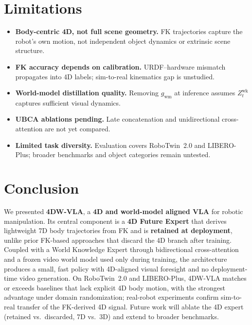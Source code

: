 \documentclass[journal]{IEEEtran}
\begin{document}
\section{Limitations}
\label{sec:limitations}

\begin{itemize}
\item \textbf{Body-centric 4D, not full scene geometry.} FK trajectories
  capture the robot's own motion, not independent object dynamics or
  extrinsic scene structure.
\item \textbf{FK accuracy depends on calibration.} URDF--hardware
  mismatch propagates into 4D labels; sim-to-real kinematics gap is
  unstudied.
\item \textbf{World-model distillation quality.} Removing
  $g_{\mathrm{wm}}$ at inference assumes $Z^{\mathrm{wk}}_t$ captures
  sufficient visual dynamics.
\item \textbf{UBCA ablations pending.} Late concatenation and
  unidirectional cross-attention are not yet compared.
\item \textbf{Limited task diversity.} Evaluation covers RoboTwin~2.0 and
  LIBERO-Plus; broader benchmarks and object categories remain untested.
\end{itemize}

\section{Conclusion}
\label{sec:conclusion}

We presented \textbf{4DW-VLA}, a \textbf{4D and world-model aligned VLA}
for robotic manipulation. Its central component is a \textbf{4D Future
Expert} that derives lightweight 7D body trajectories from FK and is
\textbf{retained at deployment}, unlike prior FK-based approaches that
discard the 4D branch after training. Coupled with a World Knowledge
Expert through bidirectional cross-attention and a frozen video world
model used only during training, the architecture produces a small,
fast policy with 4D-aligned visual foresight and no deployment-time video
generation. On RoboTwin~2.0 and LIBERO-Plus, 4DW-VLA matches or exceeds baselines
that lack explicit 4D body motion, with the strongest advantage under
domain randomization; real-robot experiments confirm sim-to-real transfer
of the FK-derived 4D signal. Future work will ablate the 4D expert
(retained vs.\ discarded, 7D vs.\ 3D) and extend to broader benchmarks.

\FloatBarrier


\end{document}
